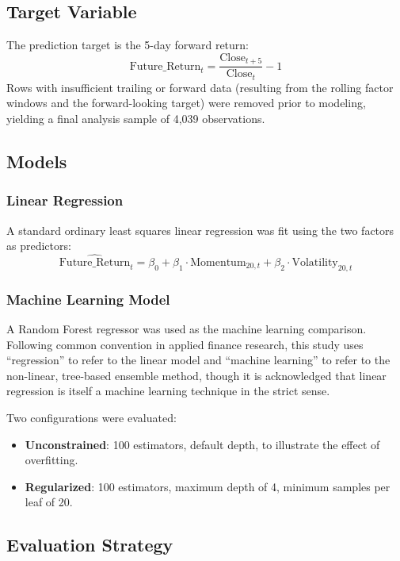 \documentclass[11pt]{article}
\begin{document}
\subsection{Target Variable}
The prediction target is the 5-day forward return:
\begin{equation}
    \text{Future\_Return}_{t} = \frac{\text{Close}_{t+5}}{\text{Close}_{t}} - 1
\end{equation}
Rows with insufficient trailing or forward data (resulting from the rolling factor windows and the forward-looking target) were removed prior to modeling, yielding a final analysis sample of 4{,}039 observations.

\subsection{Models}

\subsubsection{Linear Regression}
A standard ordinary least squares linear regression was fit using the two factors as predictors:
\begin{equation}
    \widehat{\text{Future\_Return}}_t = \beta_0 + \beta_1 \cdot \text{Momentum}_{20,t} + \beta_2 \cdot \text{Volatility}_{20,t}
\end{equation}

\subsubsection{Machine Learning Model}
A Random Forest regressor was used as the machine learning comparison. Following common convention in applied finance research, this study uses ``regression'' to refer to the linear model and ``machine learning'' to refer to the non-linear, tree-based ensemble method, though it is acknowledged that linear regression is itself a machine learning technique in the strict sense.

Two configurations were evaluated:
\begin{itemize}
    \item \textbf{Unconstrained}: 100 estimators, default depth, to illustrate the effect of overfitting.
    \item \textbf{Regularized}: 100 estimators, maximum depth of 4, minimum samples per leaf of 20.
\end{itemize}

\subsection{Evaluation Strategy}
\end{document}
